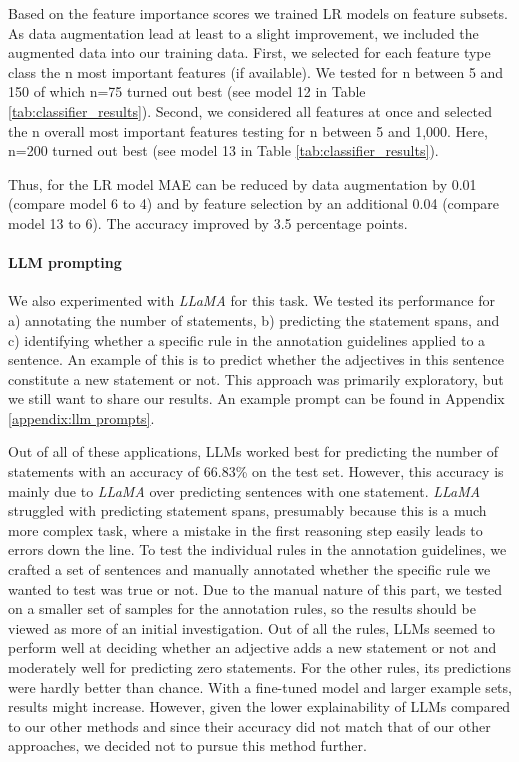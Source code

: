 \documentclass[11pt]{article}
\begin{document}
Based on the feature importance scores we trained LR models on feature subsets. As data augmentation lead at least to a slight improvement, we included the augmented data into our training data. First, we selected for each feature type class the n most important features (if available). We tested for n between 5 and 150 of which n=75 turned out best (see model 12 in Table \ref{tab:classifier_results}).
Second, we considered all features at once and selected the n overall most important features testing for n between 5 and 1,000. Here, n=200 turned out best (see model 13 in Table \ref{tab:classifier_results}).  

Thus, for the LR model MAE can be reduced by data augmentation by 0.01 (compare model 6 to 4) and by feature selection by an additional 0.04 (compare model 13 to 6). The accuracy improved by 3.5 percentage points. 



\paragraph{LLM prompting} We also experimented with \textit{LLaMA} for this task. We tested its performance for a) annotating the number of statements, b) predicting the statement spans, and c) identifying whether a specific rule in the annotation guidelines applied to a sentence. An example of this is to predict whether the adjectives in this sentence constitute a new statement or not. This approach was primarily exploratory, but we still want to share our results. An example prompt can be found in Appendix \ref{appendix:llm prompts}.

Out of all of these applications, LLMs worked best for predicting the number of statements with an accuracy of 66.83\% on the test set. However, this accuracy is mainly due to 	\textit{LLaMA} over predicting sentences with one statement. 	\textit{LLaMA} struggled with predicting statement spans, presumably because this is a much more complex task, where a mistake in the first reasoning step easily leads to errors down the line.
To test the individual rules in the annotation guidelines, we crafted a set of sentences and manually annotated whether the specific rule we wanted to test was true or not. Due to the manual nature of this part, we tested on a smaller set of samples for the annotation rules, so the results should be viewed as more of an initial investigation. Out of all the rules, LLMs seemed to perform well at deciding whether an adjective adds a new statement or not and moderately well for predicting zero statements. For the other rules, its predictions were hardly better than chance.
With a fine-tuned model and larger example sets, results might increase. 
However, given the lower explainability of LLMs compared to our other methods and since their accuracy did not match that of our other approaches, we decided not to pursue this method further.
\end{document}
